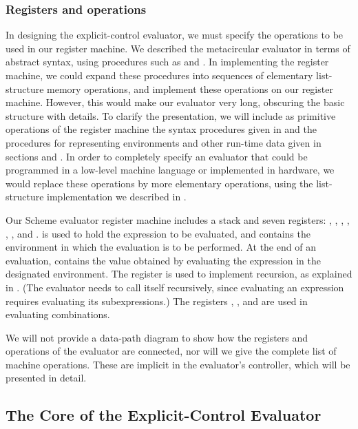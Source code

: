 \subsubsection*{Registers and operations}

In designing the explicit-control evaluator, we must specify the operations to
be used in our register machine.  We described the metacircular evaluator in
terms of abstract syntax, using procedures such as  and
.  In implementing the register machine, we could expand
these procedures into sequences of elementary list-structure memory operations,
and implement these operations on our register machine.  However, this would
make our evaluator very long, obscuring the basic structure with details.  To
clarify the presentation, we will include as primitive operations of the
register machine the syntax procedures given in  and the
procedures for representing environments and other run-time data given in
sections  and .  In order to completely specify an
evaluator that could be programmed in a low-level machine language or
implemented in hardware, we would replace these operations by more elementary
operations, using the list-structure implementation we described in
.

Our Scheme evaluator register machine includes a stack and seven registers:
, , , , , ,
and .   is used to hold the expression to be evaluated,
and  contains the environment in which the evaluation is to be
performed.  At the end of an evaluation,  contains the value obtained
by evaluating the expression in the designated environment.  The
 register is used to implement recursion, as explained in
.  (The evaluator needs to call itself recursively, since
evaluating an expression requires evaluating its subexpressions.)  The
registers , , and  are used in evaluating
combinations.

We will not provide a data-path diagram to show how the registers and
operations of the evaluator are connected, nor will we give the complete list
of machine operations.  These are implicit in the evaluator's controller, which
will be presented in detail.



\subsection{The Core of the Explicit-Control Evaluator}
\label{Section 5.4.1}

